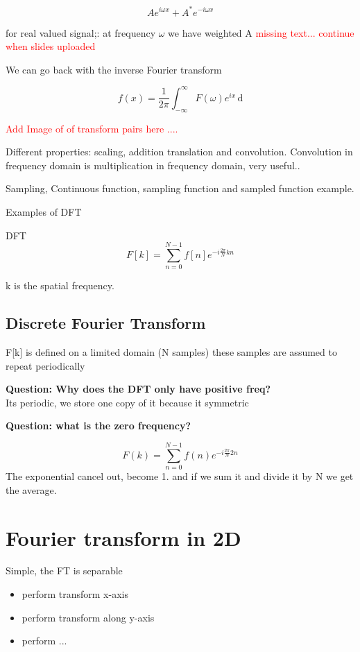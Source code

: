 \begin{equation}
Ae^{i\omega x} + A^{*}e^{-i\omega x}
\end{equation}

for real valued signal;:
at frequency $\omega$ we have weighted A \textcolor{red}{missing text... continue when slides uploaded}  %

We can go back with the inverse Fourier transform

\begin{equation}
f(x) = \frac{1} {2\pi} \int_{-\infty}^{\infty} F(\omega) e^{ix} \,\text{d} 
\end{equation}

\textcolor{red}{Add Image of of transform pairs here ....}  

Different properties: scaling, addition translation and convolution. Convolution in frequency domain is multiplication in frequency domain, very useful.. 


Sampling, Continuous function, sampling function and sampled function example. 

Examples of DFT

DFT
\begin{equation}
F[k] = \sum_{n=0}^{N-1} f[n] e^{-i \frac{2\pi} {N}kn } %
\end{equation}

k is the spatial frequency.

\subsection*{Discrete Fourier Transform}
F[k] is defined on a limited domain (N samples) these samples are assumed to repeat periodically



\textbf{Question: Why does the DFT only have positive freq?}\\
Its periodic, we store one copy of it because it symmetric  

\textbf{Question: what is the zero frequency?} 


\begin{equation}
F(k) = \sum_{n=0}^{N-1} f(n)e^{-i \frac{2\pi} {N}2n } %
\end{equation}
The exponential cancel out, become 1. and if we sum it and divide it by N we get the average.


\section{Fourier transform in 2D}
Simple, the FT is separable
\begin{itemize}
	\item perform transform x-axis
	\item perform transform along y-axis
	\item perform ...
\end{itemize}

